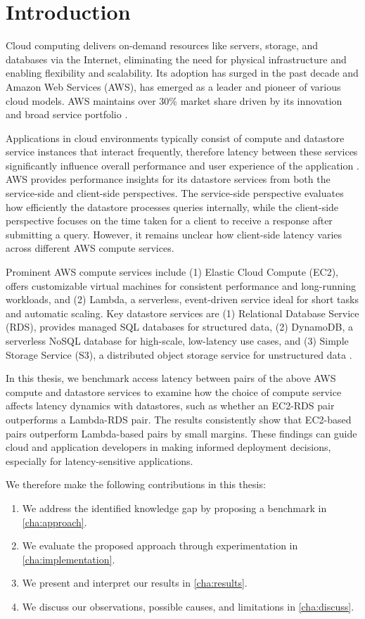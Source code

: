 \section{Introduction}
\label{cha:intro}

Cloud computing delivers on-demand resources like servers, storage, and databases via the Internet, eliminating the need for physical infrastructure and enabling flexibility and scalability. Its adoption has surged in the past decade and Amazon Web Services (AWS), has emerged as a leader and pioneer of various cloud models. AWS maintains over 30\% market share driven by its innovation and broad service portfolio \cite{}.

Applications in cloud environments typically consist of compute and datastore service instances that interact frequently, therefore latency between these services significantly influence overall performance and user experience of the application \cite{}. AWS provides performance insights for its datastore services from both the service-side and client-side perspectives. The service-side perspective evaluates how efficiently the datastore processes queries internally, while the client-side perspective focuses on the time taken for a client to receive a response after submitting a query. However, it remains unclear how client-side latency varies across different AWS compute services.

Prominent AWS compute services include (1) Elastic Cloud Compute (EC2), offers customizable virtual machines for consistent performance and long-running workloads, and (2) Lambda, a serverless, event-driven service ideal for short tasks and automatic scaling. Key datastore services are (1) Relational Database Service (RDS), provides managed SQL databases for structured data, (2) DynamoDB, a serverless NoSQL database for high-scale, low-latency use cases, and (3) Simple Storage Service (S3), a distributed object storage service for unstructured data \cite{}.

In this thesis, we benchmark access latency between pairs of the above AWS compute and datastore services to examine how the choice of compute service affects latency dynamics with datastores, such as whether an EC2-RDS pair outperforms a Lambda-RDS pair. The results consistently show that EC2-based pairs outperform Lambda-based pairs by small margins. These findings can guide cloud and application developers in making informed deployment decisions, especially for latency-sensitive applications.


We therefore make the following contributions in this thesis:
\begin{enumerate}
	\item We address the identified knowledge gap by proposing a benchmark in \cref{cha:approach}.
	\item We evaluate the proposed approach through experimentation in \cref{cha:implementation}.
	\item We present and interpret our results in \cref{cha:results}.
	\item We discuss our observations, possible causes, and limitations in \cref{cha:discuss}.
\end{enumerate}
